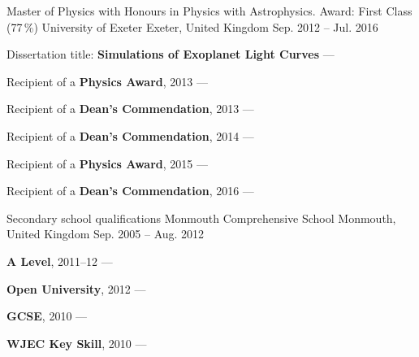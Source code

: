 \begin{cventries}
    \cventry
        {Master of Physics with Honours in Physics with Astrophysics. Award: First Class (77\,\%)} %
        {University of Exeter} %
        {Exeter, United Kingdom} %
        {Sep. 2012 -- Jul. 2016} %
        {
        \begin{cvitems} %
            \item {Dissertation title: \textbf{Simulations of Exoplanet Light Curves} --- }
            \vspace{0.5mm}
            \item {Recipient of a \textbf{Physics Award}, 2013 --- }
            \vspace{0.5mm}
            \item {Recipient of a \textbf{Dean's Commendation}, 2013 --- }
            \vspace{0.5mm}
            \item {Recipient of a \textbf{Dean's Commendation}, 2014 --- }
            \vspace{0.5mm}
            \item {Recipient of a \textbf{Physics Award}, 2015 --- }
            \vspace{0.5mm}
            \item {Recipient of a \textbf{Dean's Commendation}, 2016 --- }
        \end{cvitems}
        }

    \cventry
        {Secondary school qualifications}
        {Monmouth Comprehensive School}
        {Monmouth, United Kingdom}
        {Sep. 2005 -- Aug. 2012}
        {
        \begin{cvitems}
            \item {\textbf{A Level}, 2011--12 --- }
            \vspace{0.5mm}
            \item {\textbf{Open University}, 2012 --- }
            \vspace{0.5mm}
            \item {\textbf{GCSE}, 2010 --- }
            \vspace{0.5mm}
            \item {\textbf{WJEC Key Skill}, 2010 --- }
        \end{cvitems}
        }
\end{cventries}
